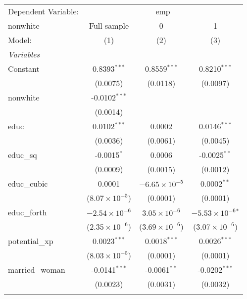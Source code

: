 
\begingroup
\centering
\begin{tabular}{lccc}
   \tabularnewline \midrule \midrule
   Dependent Variable: & \multicolumn{3}{c}{emp}\\
   nonwhite        & Full sample             & 0                       & 1 \\   
   Model:          & (1)                     & (2)                     & (3)\\  
   \midrule
   \emph{Variables}\\
   Constant        & 0.8393$^{***}$          & 0.8559$^{***}$          & 0.8210$^{***}$\\   
                   & (0.0075)                & (0.0118)                & (0.0097)\\   
   nonwhite        & -0.0102$^{***}$         &                         &   \\   
                   & (0.0014)                &                         &   \\   
   educ            & 0.0102$^{***}$          & 0.0002                  & 0.0146$^{***}$\\   
                   & (0.0036)                & (0.0061)                & (0.0045)\\   
   educ\_sq        & -0.0015$^{*}$           & 0.0006                  & -0.0025$^{**}$\\   
                   & (0.0009)                & (0.0015)                & (0.0012)\\   
   educ\_cubic     & 0.0001                  & $-6.65\times 10^{-5}$   & 0.0002$^{**}$\\   
                   & ($8.07\times 10^{-5}$)  & (0.0001)                & (0.0001)\\   
   educ\_forth     & $-2.54\times 10^{-6}$   & $3.05\times 10^{-6}$    & $-5.53\times 10^{-6}$$^{*}$\\    
                   & ($2.35\times 10^{-6}$)  & ($3.69\times 10^{-6}$)  & ($3.07\times 10^{-6}$)\\    
   potential\_xp   & 0.0023$^{***}$          & 0.0018$^{***}$          & 0.0026$^{***}$\\   
                   & ($8.03\times 10^{-5}$)  & (0.0001)                & (0.0001)\\   
   married\_woman  & -0.0141$^{***}$         & -0.0061$^{**}$          & -0.0202$^{***}$\\   
                   & (0.0023)                & (0.0031)                & (0.0032)\\   
$$
\end{tabular}
